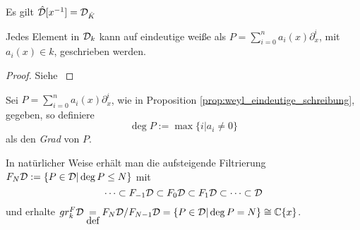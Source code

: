 \begin{bem}
Es gilt $\hat {\mathcal{D}}[x^{-1}]=\mathcal{D}_{\hat K}$
\end{bem}

\begin{comment}
Beispiele und Alternative Definition:\\
Sergey-Arkhipov-MAT1191\_Lecture\_Notes.pdf Chapter 2.1
\end{comment}

\begin{comment}
\begin{lem} %
Sei $A$ einer der 3 soeben eingeführten Objekten, so definieren die Addition 
\[ +:A\times A \rightarrow A \]
und die Multiplikation
\[ \cdot:A\times A \rightarrow A \]
eine Ringstruktur auf $A$.
\end{lem}
\begin{proof}
\cite[Kapittel 2 Section 1]{ZulaBarbara}
\end{proof}
\end{comment}


\begin{prop} \label{prop:weyl_eindeutige_schreibung}
\cite[Proposition 1.2.3]{sabbah_cimpa90}
Jedes Element in $\mathcal{D}_k$ kann auf eindeutige
weiße als $P=\sum_{i=0}^na_i(x)\partial_x^i$, mit $a_i(x)\in k$, geschrieben
werden.
\end{prop}
\begin{proof}
Siehe \cite[Proposition 1.2.3]{sabbah_cimpa90}
\begin{comment}
ein teil des Beweises ist "left as an exersice"
\end{comment}
\end{proof}

\begin{comment}
Besser?:\\
erst Filtrierung definieren und dadurch dann den Grad?
\end{comment}
\begin{defn}
Sei $P=\sum_{i=0}^na_i(x)\partial_x^i$, wie in Proposition
\ref{prop:weyl_eindeutige_schreibung}, gegeben, so definiere 
\[
\deg P:=\max\{i|a_i\neq 0\}
\]
als den \emph{Grad} von $P$.
\end{defn}
In natürlicher Weise erhält man die aufsteigende Filtrierung
$F_N\mathcal{D}:=\{P\in\mathcal{D}|\deg P\leq N\}$ mit
\[
\cdots\subset F_{-1}\mathcal{D}\subset F_{0}\mathcal{D}\subset
F_{1}\mathcal{D}\subset\cdots\subset\mathcal{D}
\]
und erhalte $gr_k^F\mathcal{D}\underset{\mbox{def}}{=}F_N\mathcal{D}\slash F_{N-1}\mathcal{D}
=\{P\in\mathcal{D}|\deg P=N\}\cong\mathbb{C}\{x\}$.

